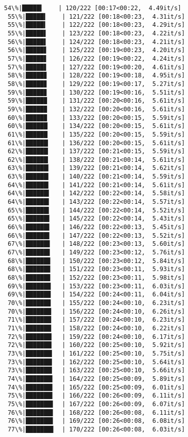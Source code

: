 \documentclass[11pt]{article}
\begin{document}
\begin{Verbatim}[commandchars=\\\{\}]
 54\%|█████▍    | 120/222 [00:17<00:22,  4.49it/s]
 55\%|█████▍    | 121/222 [00:18<00:23,  4.31it/s]
 55\%|█████▍    | 122/222 [00:18<00:23,  4.29it/s]
 55\%|█████▌    | 123/222 [00:18<00:23,  4.22it/s]
 56\%|█████▌    | 124/222 [00:18<00:23,  4.21it/s]
 56\%|█████▋    | 125/222 [00:19<00:23,  4.20it/s]
 57\%|█████▋    | 126/222 [00:19<00:22,  4.24it/s]
 57\%|█████▋    | 127/222 [00:19<00:20,  4.61it/s]
 58\%|█████▊    | 128/222 [00:19<00:18,  4.95it/s]
 58\%|█████▊    | 129/222 [00:19<00:17,  5.27it/s]
 59\%|█████▊    | 130/222 [00:19<00:16,  5.51it/s]
 59\%|█████▉    | 131/222 [00:20<00:16,  5.61it/s]
 59\%|█████▉    | 132/222 [00:20<00:16,  5.61it/s]
 60\%|█████▉    | 133/222 [00:20<00:15,  5.59it/s]
 60\%|██████    | 134/222 [00:20<00:15,  5.61it/s]
 61\%|██████    | 135/222 [00:20<00:15,  5.59it/s]
 61\%|██████▏   | 136/222 [00:20<00:15,  5.61it/s]
 62\%|██████▏   | 137/222 [00:21<00:15,  5.59it/s]
 62\%|██████▏   | 138/222 [00:21<00:14,  5.61it/s]
 63\%|██████▎   | 139/222 [00:21<00:14,  5.62it/s]
 63\%|██████▎   | 140/222 [00:21<00:14,  5.59it/s]
 64\%|██████▎   | 141/222 [00:21<00:14,  5.61it/s]
 64\%|██████▍   | 142/222 [00:22<00:14,  5.58it/s]
 64\%|██████▍   | 143/222 [00:22<00:14,  5.57it/s]
 65\%|██████▍   | 144/222 [00:22<00:14,  5.52it/s]
 65\%|██████▌   | 145/222 [00:22<00:14,  5.43it/s]
 66\%|██████▌   | 146/222 [00:22<00:13,  5.45it/s]
 66\%|██████▌   | 147/222 [00:22<00:13,  5.52it/s]
 67\%|██████▋   | 148/222 [00:23<00:13,  5.60it/s]
 67\%|██████▋   | 149/222 [00:23<00:12,  5.76it/s]
 68\%|██████▊   | 150/222 [00:23<00:12,  5.84it/s]
 68\%|██████▊   | 151/222 [00:23<00:11,  5.93it/s]
 68\%|██████▊   | 152/222 [00:23<00:11,  5.98it/s]
 69\%|██████▉   | 153/222 [00:23<00:11,  6.03it/s]
 69\%|██████▉   | 154/222 [00:24<00:11,  6.04it/s]
 70\%|██████▉   | 155/222 [00:24<00:10,  6.23it/s]
 70\%|███████   | 156/222 [00:24<00:10,  6.26it/s]
 71\%|███████   | 157/222 [00:24<00:10,  6.23it/s]
 71\%|███████   | 158/222 [00:24<00:10,  6.22it/s]
 72\%|███████▏  | 159/222 [00:24<00:10,  6.17it/s]
 72\%|███████▏  | 160/222 [00:25<00:10,  5.92it/s]
 73\%|███████▎  | 161/222 [00:25<00:10,  5.75it/s]
 73\%|███████▎  | 162/222 [00:25<00:10,  5.64it/s]
 73\%|███████▎  | 163/222 [00:25<00:10,  5.66it/s]
 74\%|███████▍  | 164/222 [00:25<00:09,  5.89it/s]
 74\%|███████▍  | 165/222 [00:25<00:09,  6.01it/s]
 75\%|███████▍  | 166/222 [00:26<00:09,  6.11it/s]
 75\%|███████▌  | 167/222 [00:26<00:09,  6.07it/s]
 76\%|███████▌  | 168/222 [00:26<00:08,  6.11it/s]
 76\%|███████▌  | 169/222 [00:26<00:08,  6.08it/s]
 77\%|███████▋  | 170/222 [00:26<00:08,  6.03it/s]

\end{Verbatim}
\end{document}
